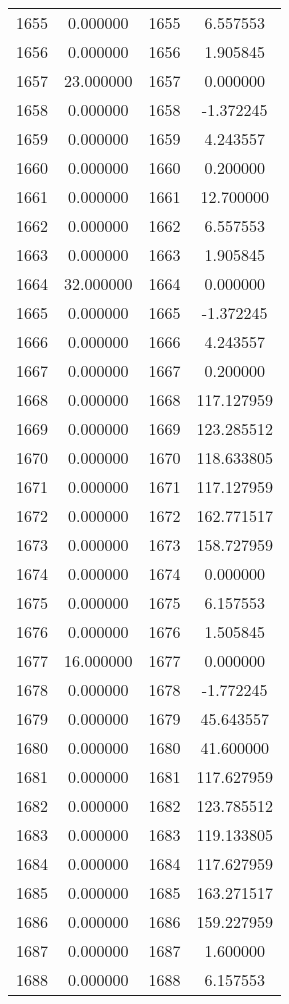 \documentclass[12pt]{article}
\begin{document}
\begin{longtable}{@{}cccc@{}}
1655 & 0.000000 & 1655 & 6.557553 \\
1656 & 0.000000 & 1656 & 1.905845 \\
1657 & 23.000000 & 1657 & 0.000000 \\
1658 & 0.000000 & 1658 & -1.372245 \\
1659 & 0.000000 & 1659 & 4.243557 \\
1660 & 0.000000 & 1660 & 0.200000 \\
1661 & 0.000000 & 1661 & 12.700000 \\
1662 & 0.000000 & 1662 & 6.557553 \\
1663 & 0.000000 & 1663 & 1.905845 \\
1664 & 32.000000 & 1664 & 0.000000 \\
1665 & 0.000000 & 1665 & -1.372245 \\
1666 & 0.000000 & 1666 & 4.243557 \\
1667 & 0.000000 & 1667 & 0.200000 \\
1668 & 0.000000 & 1668 & 117.127959 \\
1669 & 0.000000 & 1669 & 123.285512 \\
1670 & 0.000000 & 1670 & 118.633805 \\
1671 & 0.000000 & 1671 & 117.127959 \\
1672 & 0.000000 & 1672 & 162.771517 \\
1673 & 0.000000 & 1673 & 158.727959 \\
1674 & 0.000000 & 1674 & 0.000000 \\
1675 & 0.000000 & 1675 & 6.157553 \\
1676 & 0.000000 & 1676 & 1.505845 \\
1677 & 16.000000 & 1677 & 0.000000 \\
1678 & 0.000000 & 1678 & -1.772245 \\
1679 & 0.000000 & 1679 & 45.643557 \\
1680 & 0.000000 & 1680 & 41.600000 \\
1681 & 0.000000 & 1681 & 117.627959 \\
1682 & 0.000000 & 1682 & 123.785512 \\
1683 & 0.000000 & 1683 & 119.133805 \\
1684 & 0.000000 & 1684 & 117.627959 \\
1685 & 0.000000 & 1685 & 163.271517 \\
1686 & 0.000000 & 1686 & 159.227959 \\
1687 & 0.000000 & 1687 & 1.600000 \\
1688 & 0.000000 & 1688 & 6.157553 \\

\end{longtable}
\end{document}
